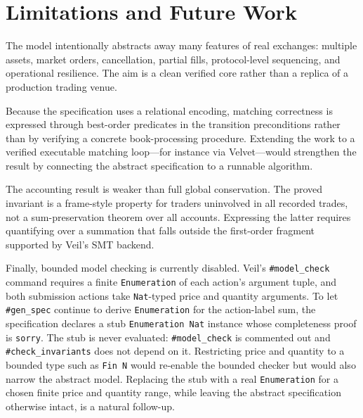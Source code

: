 \section{Limitations and Future Work}

The model intentionally abstracts away many features of real exchanges:
multiple assets, market orders, cancellation, partial fills, protocol-level
sequencing, and operational resilience. The aim is a clean verified core rather
than a replica of a production trading venue.

Because the specification uses a relational encoding, matching correctness is
expressed through best-order predicates in the transition preconditions rather
than by verifying a concrete book-processing procedure. Extending the work to
a verified executable matching loop---for instance via Velvet---would
strengthen the result by connecting the abstract specification to a runnable
algorithm.

The accounting result is weaker than full global conservation. The proved
invariant is a frame-style property for traders uninvolved in all recorded
trades, not a sum-preservation theorem over all accounts. Expressing the
latter requires quantifying over a summation that falls outside the
first-order fragment supported by Veil's SMT backend.

Finally, bounded model checking is currently disabled. Veil's
\texttt{\#model\_check} command requires a finite \texttt{Enumeration} of each
action's argument tuple, and both submission actions take \texttt{Nat}-typed
price and quantity arguments. To let \texttt{\#gen\_spec} continue to derive
\texttt{Enumeration} for the action-label sum, the specification declares a
stub \texttt{Enumeration Nat} instance whose completeness proof is
\texttt{sorry}. The stub is never evaluated: \texttt{\#model\_check} is
commented out and \texttt{\#check\_invariants} does not depend on it.
Restricting price and quantity to a bounded type such as \texttt{Fin~N} would
re-enable the bounded checker but would also narrow the abstract model.
Replacing the stub with a real \texttt{Enumeration} for a chosen finite price
and quantity range, while leaving the abstract specification otherwise
intact, is a natural follow-up.
